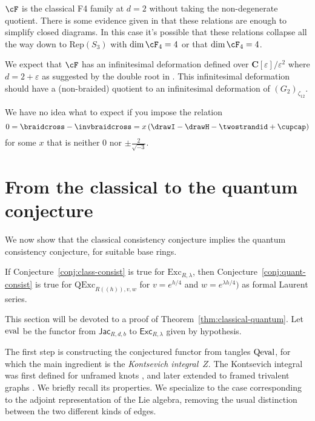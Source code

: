 \documentclass[12pt]{amsart}
\begin{document}
$\cF$ is the classical F4 family at $d=2$ without taking the non-degenerate quotient.  There is some evidence given in \cite{???} that these relations are enough to simplify closed diagrams.  In this case it's possible that these relations collapse all the way down to $\mathrm{Rep}(S_3)$ with $\dim \cF_4 = 4$ or that $\dim \cF_4 = 4$.

\begin{remark}
We expect that $\cF$ has an infinitesimal deformation defined over $\mathbf{C}[\varepsilon]/\varepsilon^2$ where $d = 2+\varepsilon$ as suggested by the double root in \cite{???}.  This infinitesimal deformation should have a (non-braided) quotient to an infinitesimal deformation of $(G_2)_{\zeta_12}$.
\end{remark}

We have no idea what to expect if you impose the relation 
$$0 = \braidcross - \invbraidcross = x \left(\drawI - \drawH - \twostrandid + \cupcap\right)$$
for some $x$ that is neither $0$ nor $\pm \frac{2}{\sqrt{-3}}$.


\section{From the classical to the quantum conjecture}
\label{sec:classical-quantum}

We now show that the classical consistency conjecture implies
the quantum consistency conjecture, for suitable base
rings.
\begin{theorem}\label{thm:classical-quantum}
  If Conjecture~\ref{conj:class-consist} is true
  for $\mathrm{Exc}_{R,\lambda}$, then
  Conjecture~\ref{conj:quant-consist} is true for
  $\mathrm{QExc}_{R((h)),v,w}$ for $v=e^{h/4}$ and $w=e^{\lambda
    h/4})$ as formal Laurent series.
\end{theorem}
This section will be devoted to a proof of
Theorem~\ref{thm:classical-quantum}. Let $\operatorname{eval}$ be the functor from
$\mathsf{Jac}_{R,d,b}$ to $\mathsf{Exc}_{R,\lambda}$ given by hypothesis.

The first step is constructing
the conjectured functor from tangles $\operatorname{Qeval}$, for which the main
ingredient is the
\emph{Kontsevich integral}~$Z$. The Kontsevich integral was first
defined for unframed knots \cite{MR1318886}, and later extended to
framed trivalent graphs \cite{MR1473309,MR2304469,MR2661529}. We
briefly recall its properties. We specialize to the case corresponding
to the adjoint representation of the Lie algebra, removing the usual
distinction between the two different kinds of edges.
\end{document}
